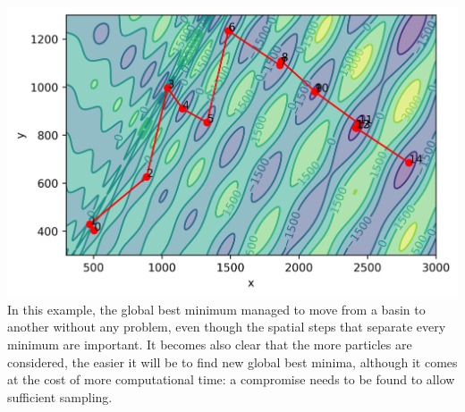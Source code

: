 \documentclass[11pt]{article}
\begin{document}
\begin{multicols}{2}
\noindent\includegraphics[width=\columnwidth]{figures/eggholder.png} \medskip 
In this example, the global best minimum managed to move from a basin to another without any problem, even though the spatial steps that separate every minimum are important. It becomes also clear that the more particles are considered, the easier it will be to find new global best minima, although it comes at the cost of more computational time: a compromise needs to be found to allow sufficient sampling.


\end{multicols}
\end{document}
